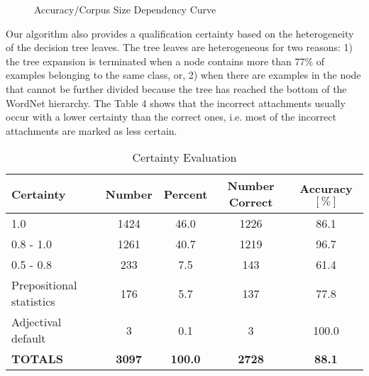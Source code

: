 \begin{figure}[t]
  \leavevmode
  \begin{center}
	
    \caption{Accuracy/Corpus Size Dependency Curve}
    \label{fig:3}
  \end{center}
\end{figure}


Our algorithm also provides a qualification certainty based on the heterogeneity of the decision tree leaves. The tree leaves are heterogeneous for two reasons: 1) the tree expansion is terminated when a node contains more than 77\% of examples belonging to the same class, or, 2) when there are examples in the node that cannot be further divided because the tree has reached the bottom of the WordNet hierarchy. The Table 4 shows that the incorrect attachments usually occur with a lower certainty than the correct ones, i.e. most of the incorrect attachments are marked as less certain.


\begin{table}[t]
  \leavevmode
    \caption{Certainty Evaluation}
    \label{tab:4}
  \begin{center}
\begin{tabular}[c]{|l|c|c|c|c|}\hline
{\bf Certainty} & {\bf Number} & {\bf Percent} & {\bf Number Correct} & {\bf Accuracy $[\%]$}\\\hline
1.0 & 1424 & 46.0  & 1226 & 86.1 \\\hline
0.8 - 1.0  & 1261 & 40.7 & 1219 & 96.7 \\\hline
0.5 - 0.8 & 233 & 7.5 & 143 & 61.4\\\hline
Prepositional statistics & 176 & 5.7 & 137 & 77.8\\\hline
Adjectival default & 3 & 0.1 & 3 & 100.0\\\hline
{\bf TOTALS} & {\bf 3097} & {\bf 100.0} & {\bf 2728} & {\bf 88.1}\\\hline
\end{tabular}
\end{center}
\end{table}


